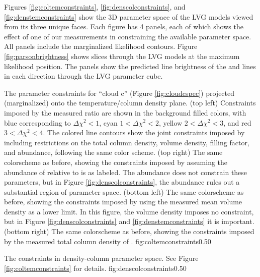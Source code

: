 Figures \ref{fig:coltemconstraints}, \ref{fig:denscolconstraints}, and
\ref{fig:denstemconstraints} show the 3D parameter space of the LVG models
viewed from its three unique faces.  Each figure has 4 panels, each of which
shows the effect of one of our measurements in constraining the available
parameter space.  All panels include the marginalized likelihood contours.
Figure \ref{fig:parsonbrightness} shows slices through the LVG models at the
maximum likelihood position.  The panels show the predicted line brightness of
the \threeohthree and \threetwoone lines in each direction through the LVG
parameter cube.

{The parameter constraints for ``cloud c'' (Figure \ref{fig:cloudcspec})
projected (marginalized) onto the temperature/column density plane.\newline
(top left) Constraints imposed by the measured ratio \Rone are shown in the
background filled colors,
with blue corresponding to $\Delta\chi^2 < 1$, cyan $1 < \Delta\chi^2 < 2$,
yellow $2 < \Delta\chi^2 < 3$, and red $3 < \Delta\chi^2 < 4$.  The colored line
contours show the joint constraints imposed by including restrictions on the
total column density, volume density,  filling factor, and abundance, following
the same color
scheme.
\newline
(top right) The same colorscheme as before, showing the constraints imposed by
assuming the abundance of \para relative to \hh is as labeled.  
The abundance does not constrain these parameters, but in Figure
\ref{fig:denscolconstraints}, the abundance rules out a substantial region of parameter
space.
\newline
(bottom left) The same colorscheme as before, showing the constraints imposed
by using the measured mean volume density as a lower limit.  In this figure,
the volume density imposes no constraint, but in Figure \ref{fig:denscolconstraints}
and \ref{fig:denstemconstraints} it is important.
\newline
(bottom right) The same colorscheme as before, showing the constraints imposed
by the measured total column density of \hh.
}
{fig:coltemconstraints}{0.5}{0}

{The constraints in density-column parameter space.
See Figure \ref{fig:coltemconstraints} for details.
}
{fig:denscolconstraints}{0.5}{0}

